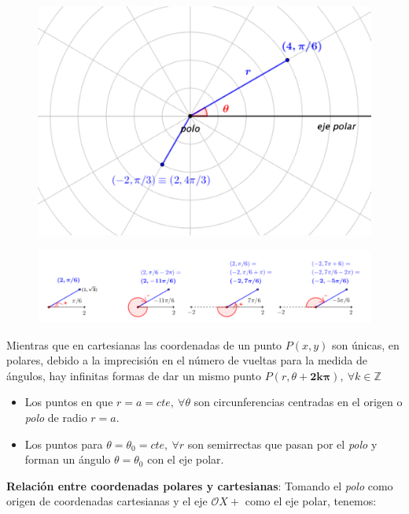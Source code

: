 \begin{figure}[H]
	\centering
	\includegraphics[width=.5\textwidth]{img-polares/polares21.png}
	\end{figure}
	
	
\begin{figure}[H]
	\centering
	\includegraphics[width=.9\textwidth]{img-polares/polares24.png}
	\end{figure}

Mientras que en cartesianas las coordenadas de un punto $P(x,y)$ son únicas, en polares, debido a la imprecisión en el número de vueltas para la medida de ángulos, hay infinitas formas de dar un mismo punto $P(r,\theta+\boldsymbol{2k\pi}),\ \forall k\in \mathbb Z$

\begin{itemize}
\item 	Los puntos en que $r=a=cte, \ \forall \theta$ son circunferencias centradas en el origen o \emph{polo} de radio $r=a$.
\item   Los puntos para $\theta=\theta_0=cte,\ \forall r$ son semirrectas que pasan por el \emph{polo} y forman un ángulo $\theta=\theta_0$ con el eje polar.
\end{itemize}

\large{\textbf{Relación entre coordenadas polares y cartesianas}}\normalsize{:} Tomando el \emph{polo} como origen de coordenadas cartesianas y el eje $\mathcal OX+$ como el eje polar, tenemos:

